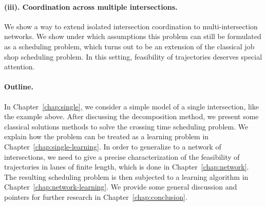 \documentclass[a4paper]{report}
\theoremstyle{definition}
\theoremstyle{plain}
\begin{document}
\paragraph{(iii). Coordination across multiple intersections.}
We show a way to extend isolated intersection coordination to multi-intersection
networks. We show under which assumptions this problem can still be formulated
as a scheduling problem, which turns out to be an extension of the classical job
shop scheduling problem.
%
In this setting, feasibility of trajectories deserves special attention.

\paragraph{Outline.}

In Chapter~\ref{chap:single}, we consider a simple model of a single
intersection, like the example above. After discussing the decomposition method,
we present some classical solutions methods to solve the crossing time
scheduling problem.
%
We explain how the problem can be treated as a learning problem in
Chapter~\ref{chap:single-learning}.
%
In order to generalize to a network of intersections, we need to give a precise
characterization of the feasibility of trajectories in lanes of finite length,
which is done in Chapter~\ref{chap:network}.
%
The resulting scheduling problem is then subjected to a learning algorithm in
Chapter~\ref{chap:network-learning}.
%
We provide some general discussion and pointers for further research in
Chapter~\ref{chap:conclusion}.




\end{document}
